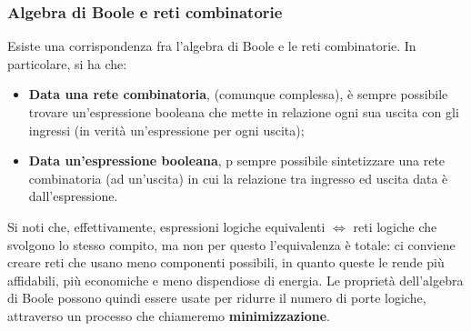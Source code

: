 \documentclass[a4paper,11pt]{article}
\begin{document}
\subsubsection{Algebra di Boole e reti combinatorie}
Esiste una corrispondenza fra l'algebra di Boole e le reti combinatorie.
In particolare, si ha che:
\begin{itemize}
	\item \textbf{Data una rete combinatoria}, (comunque complessa), è sempre possibile trovare un'espressione booleana che mette in relazione ogni sua uscita con gli ingressi (in verità un'espressione per ogni uscita);
	\item \textbf{Data un'espressione booleana}, p sempre possibile sintetizzare una rete combinatoria (ad un'uscita) in cui la relazione tra ingresso ed uscita data è dall'espressione.
\end{itemize}

Si noti che, effettivamente, espressioni logiche equivalenti $\Leftrightarrow$ reti logiche che svolgono lo stesso compito, ma non per questo l'equivalenza è totale: ci conviene creare reti che usano meno componenti possibili, in quanto queste le rende più affidabili, più economiche e meno dispendiose di energia.
Le proprietà dell'algebra di Boole possono quindi essere usate per ridurre il numero di porte logiche, attraverso un processo che chiameremo \textbf{minimizzazione}.
\end{document}
